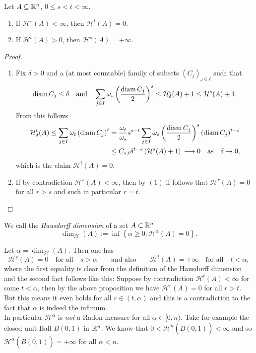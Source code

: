 \begin{proposition}
Let $A \subseteq \mathbb{R}^n$, $0 \leq s < t < \infty$.
\begin{enumerate}[(1)]
\item If $\mathcal{H}^s(A) < \infty$, then $\mathcal{H}^t(A) = 0$. 
\item If $\mathcal{H}^t(A) > 0$, then $\mathcal{H}^s(A) = +\infty$.
\end{enumerate}
\end{proposition}
\begin{proof}
\begin{enumerate}[(1)]
\item Fix $\delta > 0$ and a (at most countable) family of subsets 
$(C_j)_{j\in I}$ such that 
\[
\operatorname{diam} C_j \leq \delta 
\quad \text{and} \quad
\sum_{j\in I} \omega_s
\left(\frac{\operatorname{diam} C_j}{2}\right)^s \leq \mathcal{H}^s_\delta(A) + 1 \leq
\mathcal{H}^s(A) + 1.
\]
From this follows
\[
\begin{aligned}
\mathcal{H}^t_\delta(A) \leq \sum_{j\in I} \omega_t \left(\operatorname{diam} C_j\right)^t 
&= \frac{\omega_t}{\omega_s} s^{s-t} \sum_{j\in I} \omega_s 
\left(\frac{\operatorname{diam} C_j}{2} \right)^s (\operatorname{diam} C_j)^{t-s}
\\ &\leq C_{s,t} \delta^{t-s} \left(\mathcal{H}^s(A) +1 \right) 
\, \longrightarrow 0 \quad \text{as} \quad \delta \to 0,
\end{aligned}
\]
which is the claim $\mathcal{H}^t(A) = 0$.
\item If by contradiction $\mathcal{H}^s(A) < \infty$, then by $(1)$ if follows
that $\mathcal{H}^r(A) = 0$ for all $ r > s$ and such in particular $r = t$.
\end{enumerate}
\end{proof}

\begin{definition}
We call the \emph{Hausdorff dimension} of a set $A\subset \mathbb{R}^n$
\[
\dim_{\mathcal{H}}(A) := \inf\left\{ \alpha \geq 0 : \mathcal{H}^\alpha(A) = 0
\right\}.
\]
\end{definition}

\begin{remark}
Let $\alpha = \dim_{\mathcal{H}}(A)$. Then one has
\[
\mathcal{H}^s(A) = 0 \quad \text{for all} \quad s > \alpha
\qquad \text{and also} \qquad
\mathcal{H}^t(A) = +\infty \quad \text{for all} \quad t < \alpha,
\]
where the first equality is clear from the definition of the Hausdorff dimension
and the second fact follows like this: Suppose by contradiction
$\mathcal{H}^t(A) < \infty$ for some $t < \alpha$, then by the
above proposition we have $\mathcal{H}^r(A) = 0$ for all $ r > t$. But this
means it even holds for all $r \in (t,\alpha)$ and this is a  
contradiction to the fact that $\alpha$ is indeed the infimum. 
\\ 
In particular $\mathcal{H}^\alpha$ is \emph{not} a Radon measure for all $\alpha \in
[0,n)$. Take for example the closed unit Ball $\overline{B(0,1)}$ in $\mathbb{R}^n$. We
know that $0 < \mathcal{H}^n(\overline{B(0,1)}) < \infty$ and so
$\mathcal{H}^\alpha(\overline{B(0,1)}) = +\infty$ for all $\alpha < n$.
\end{remark}

